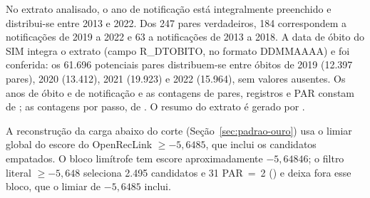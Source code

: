 No extrato analisado, o ano de notificação está integralmente preenchido e distribui-se entre 2013 e 2022. Dos 247 pares verdadeiros, 184 correspondem a notificações de 2019 a 2022 e 63 a notificações de 2013 a 2018. A data de óbito do SIM integra o extrato (campo R\_DTOBITO, no formato DDMMAAAA) e foi conferida: os 61.696 potenciais pares distribuem-se entre óbitos de 2019 (12.397 pares), 2020 (13.412), 2021 (19.923) e 2022 (15.964), sem valores ausentes. Os anos de óbito e de notificação e as contagens de pares, registros e PAR constam de ; as contagens por passo, de . O resumo do extrato é gerado por .

A reconstrução da carga abaixo do corte (Seção~\ref{sec:padrao-ouro}) usa o limiar global do escore do OpenRecLink $\geq -5{,}6485$, que inclui os candidatos empatados. O bloco limítrofe tem escore aproximadamente $-5{,}64846$; o filtro literal $\geq -5{,}648$ seleciona 2.495 candidatos e 31 PAR~=~2 () e deixa fora esse bloco, que o limiar de $-5{,}6485$ inclui.
